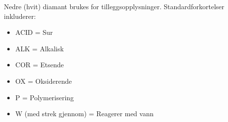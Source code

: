 \vskip 10pt

Nedre (hvit) diamant brukes for tilleggsopplysninger. Standardforkortelser inkluderer:

\begin{itemize}
\item{} ACID = Sur
\item{} ALK = Alkalisk
\item{} COR = Etsende
\item{} OX = Oksiderende
\item{} P = Polymerisering
\item{} W (med strek gjennom) = Reagerer med vann
\end{itemize}










